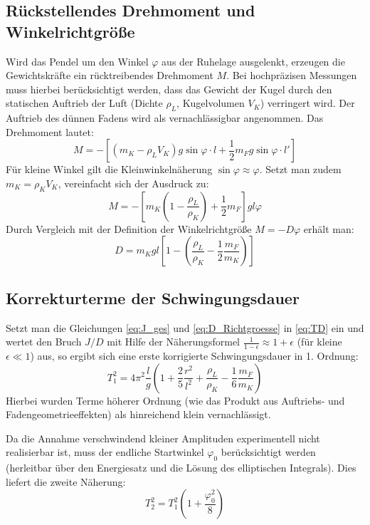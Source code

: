 \documentclass[12pt,a4paper,titlepage]{scrartcl}
\numberwithin{equation}{section}
\numberwithin{table}{section}
\numberwithin{figure}{section}
\begin{document}
\subsection{Rückstellendes Drehmoment und Winkelrichtgröße}
Wird das Pendel um den Winkel $\varphi$ aus der Ruhelage ausgelenkt, erzeugen die Gewichtskräfte ein rücktreibendes Drehmoment $M$. Bei hochpräzisen Messungen muss hierbei berücksichtigt werden, dass das Gewicht der Kugel durch den statischen Auftrieb der Luft (Dichte $\rho_L$, Kugelvolumen $V_K$) verringert wird. Der Auftrieb des dünnen Fadens wird als vernachlässigbar angenommen. Das Drehmoment lautet:
\begin{equation}
    M = - \left[ (m_K - \rho_L V_K)g \sin \varphi \cdot l + \frac{1}{2} m_F g \sin \varphi \cdot l' \right]
    \label{eq:Drehmoment}
\end{equation}
Für kleine Winkel gilt die Kleinwinkelnäherung $\sin \varphi \approx \varphi$. Setzt man zudem $m_K = \rho_K V_K$, vereinfacht sich der Ausdruck zu:
\begin{equation}
    M = - \left[ m_K \left(1 - \frac{\rho_L}{\rho_K}\right) + \frac{1}{2}m_F \right] g l \varphi
\end{equation}
Durch Vergleich mit der Definition der Winkelrichtgröße $M = -D\varphi$ erhält man:
\begin{equation}
    D = m_K g l \left[ 1 - \left( \frac{\rho_L}{\rho_K} - \frac{1}{2}\frac{m_F}{m_K} \right) \right]
    \label{eq:D_Richtgroesse}
\end{equation}

\subsection{Korrekturterme der Schwingungsdauer}
Setzt man die Gleichungen \eqref{eq:J_ges} und \eqref{eq:D_Richtgroesse} in \eqref{eq:TD} ein und wertet den Bruch $J/D$ mit Hilfe der Näherungsformel $\frac{1}{1-\epsilon} \approx 1+\epsilon$ (für kleine $\epsilon \ll 1$) aus, so ergibt sich eine erste korrigierte Schwingungsdauer in 1. Ordnung:
\begin{equation}
    T_1^2 = 4\pi^2 \frac{l}{g} \left( 1 + \frac{2}{5}\frac{r^2}{l^2} + \frac{\rho_L}{\rho_K} - \frac{1}{6}\frac{m_F}{m_K} \right)
    \label{eq:T1}
\end{equation}
Hierbei wurden Terme höherer Ordnung (wie das Produkt aus Auftriebs- und Fadengeometrieeffekten) als hinreichend klein vernachlässigt.

Da die Annahme verschwindend kleiner Amplituden experimentell nicht realisierbar ist, muss der endliche Startwinkel $\varphi_0$ berücksichtigt werden (herleitbar über den Energiesatz und die Lösung des elliptischen Integrals). Dies liefert die zweite Näherung:
\begin{equation}
    T_2^2 = T_1^2 \left( 1 + \frac{\varphi_0^2}{8} \right)
    \label{eq:T2}
\end{equation}
\end{document}
